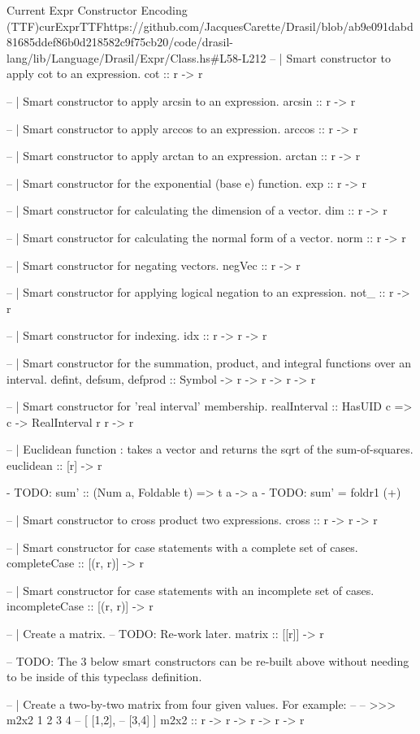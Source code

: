 \begin{haskell}{Current Expr Constructor Encoding (TTF)}{curExprTTF}{https://github.com/JacquesCarette/Drasil/blob/ab9e091dabd81685ddef86b0d218582c9f75cb20/code/drasil-lang/lib/Language/Drasil/Expr/Class.hs\#L58-L212}
  -- | Smart constructor to apply cot to an expression.
  cot :: r -> r 
  
  -- | Smart constructor to apply arcsin to an expression.
  arcsin :: r -> r 
  
  -- | Smart constructor to apply arccos to an expression.
  arccos :: r -> r 
  
  -- | Smart constructor to apply arctan to an expression.
  arctan :: r -> r 
  
  -- | Smart constructor for the exponential (base e) function.
  exp :: r -> r
  
  -- | Smart constructor for calculating the dimension of a vector.
  dim :: r -> r
  
  -- | Smart constructor for calculating the normal form of a vector.
  norm :: r -> r
  
  -- | Smart constructor for negating vectors.
  negVec :: r -> r
  
  -- | Smart constructor for applying logical negation to an expression.
  not_ :: r -> r
  
  -- | Smart constructor for indexing.
  idx :: r -> r -> r
  
  -- | Smart constructor for the summation, product, and integral functions over an interval.
  defint, defsum, defprod :: Symbol -> r -> r -> r -> r
  
  -- | Smart constructor for 'real interval' membership.
  realInterval :: HasUID c => c -> RealInterval r r -> r
  
  -- | Euclidean function : takes a vector and returns the sqrt of the sum-of-squares.
  euclidean :: [r] -> r
  
  -   TODO:  sum' :: (Num a, Foldable t) => t a -> a
  -   TODO:  sum' = foldr1 (+)
    
  -- | Smart constructor to cross product two expressions.
  cross :: r -> r -> r
  
  -- | Smart constructor for case statements with a complete set of cases.
  completeCase :: [(r, r)] -> r
  
  -- | Smart constructor for case statements with an incomplete set of cases.
  incompleteCase :: [(r, r)] -> r
  
  -- | Create a matrix.
  -- TODO: Re-work later.
  matrix :: [[r]] -> r
  
  
  -- TODO: The 3 below smart constructors can be re-built above without needing to be inside of this typeclass definition.
  
  
  -- | Create a two-by-two matrix from four given values. For example:
  --
  -- >>> m2x2 1 2 3 4
  -- [ [1,2],
  --   [3,4] ]
  m2x2 :: r -> r -> r -> r -> r
  

\end{haskell}
